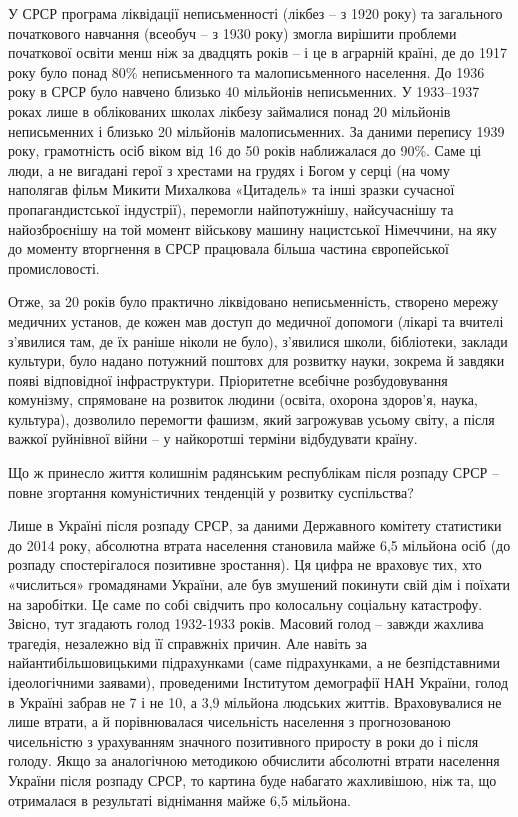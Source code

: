 \documentclass[../main]{subfiles}
\begin{document}
У СРСР програма ліквідації неписьменності (лікбез – з 1920 року) та загального початкового навчання (всеобуч – з 1930 року) змогла вирішити проблеми початкової освіти менш ніж за двадцять років – і це в аграрній країні, де до 1917 року було понад 80\% неписьменного та малописьменного населення. До 1936 року в СРСР було навчено близько 40 мільйонів неписьменних. У 1933–1937 роках лише в облікованих школах лікбезу займалися понад 20 мільйонів неписьменних і близько 20 мільйонів малописьменних. За даними перепису 1939 року, грамотність осіб віком від 16 до 50 років наближалася до 90\%. Саме ці люди, а не вигадані герої з хрестами на грудях і Богом у серці (на чому наполягав фільм Микити Михалкова «Цитадель» та інші зразки сучасної пропагандистської індустрії), перемогли найпотужнішу, найсучаснішу та найозброєнішу на той момент військову машину нацистської Німеччини, на яку до моменту вторгнення в СРСР працювала більша частина європейської промисловості.

Отже, за 20 років було практично ліквідовано неписьменність, створено мережу медичних установ, де кожен мав доступ до медичної допомоги (лікарі та вчителі з’явилися там, де їх раніше ніколи не було), з’явилися школи, бібліотеки, заклади культури, було надано потужний поштовх для розвитку науки, зокрема й завдяки появі відповідної інфраструктури. Пріоритетне всебічне розбудовування комунізму, спрямоване на розвиток людини (освіта, охорона здоров’я, наука, культура), дозволило перемогти фашизм, який загрожував усьому світу, а після важкої руйнівної війни – у найкоротші терміни відбудувати країну.

Що ж принесло життя колишнім радянським республікам після розпаду СРСР – повне згортання комуністичних тенденцій у розвитку суспільства?

Лише в Україні після розпаду СРСР, за даними Державного комітету статистики до 2014 року, абсолютна втрата населення становила майже 6,5 мільйона осіб (до розпаду спостерігалося позитивне зростання). Ця цифра не враховує тих, хто «числиться» громадянами України, але був змушений покинути свій дім і поїхати на заробітки. Це саме по собі свідчить про колосальну соціальну катастрофу. Звісно, тут згадають голод 1932-1933 років. Масовий голод – завжди жахлива трагедія, незалежно від її справжніх причин. Але навіть за найантибільшовицькими підрахунками (саме підрахунками, а не безпідставними ідеологічними заявами), проведеними Інститутом демографії НАН України, голод в Україні забрав не 7 і не 10, а 3,9 мільйона людських життів. Враховувалися не лише втрати, а й порівнювалася чисельність населення з прогнозованою чисельністю з урахуванням значного позитивного приросту в роки до і після голоду. Якщо за аналогічною методикою обчислити абсолютні втрати населення України після розпаду СРСР, то картина буде набагато жахливішою, ніж та, що отрималася в результаті віднімання майже 6,5 мільйона.
\end{document}
